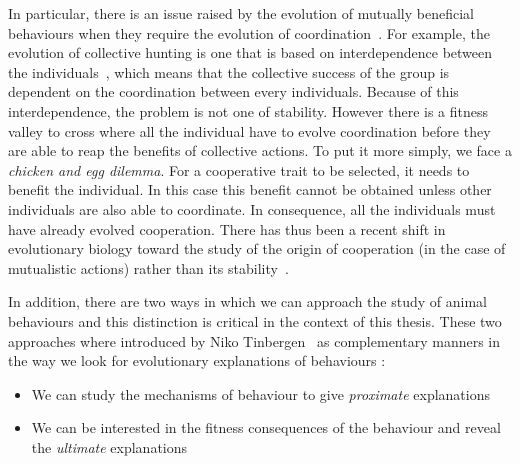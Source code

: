 
    In particular, there is an issue raised by the evolution of mutually beneficial behaviours when they require the evolution of coordination~\parencite{Alvard2001, Alvard2003, Leimar2003, Drea2009}. For example, the evolution of collective hunting is one that is based on interdependence between the individuals~\parencite{Tomasello2012}, which means that the collective success of the group is dependent on the coordination between every individuals. Because of this interdependence, the problem is not one of stability. However there is a fitness valley to cross where all the individual have to evolve coordination before they are able to reap the benefits of collective actions. To put it more simply, we face a \emph{chicken and egg dilemma}. For a cooperative trait to be selected, it needs to benefit the individual. In this case this benefit cannot be obtained unless other individuals are also able to coordinate. In consequence, all the individuals must have already evolved cooperation. There has thus been a recent shift in evolutionary biology toward the study of the origin of cooperation (in the case of mutualistic actions) rather than its stability~\parencite{Forber2015}.


    In addition, there are two ways in which we can approach the study of animal behaviours and this distinction is critical in the context of this thesis. These two approaches where introduced by Niko Tinbergen~\parencite{Tinbergen1963, West2007a} as complementary manners in the way we look for evolutionary explanations of behaviours :

    \begin{itemize}
      \item {We can study the mechanisms of behaviour to give \emph{proximate} explanations}
      \item {We can be interested in the fitness consequences of the behaviour and reveal the \emph{ultimate} explanations}
    \end{itemize}

